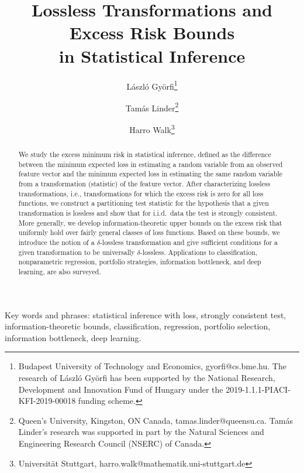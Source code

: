 \documentclass[11pt]{article}
\begin{document}
\thispagestyle{empty}
\setcounter{page}{1}


\title{Lossless Transformations and Excess Risk Bounds  \\in Statistical Inference}
\author{
L\'aszl\'o Gy\"orfi\thanks{Budapest University of Technology and Economics, gyorfi@cs.bme.hu. The research of L\'aszl\'o Gy\"orfi has been supported by the National Research, Development and Innovation Fund of Hungary under the 2019-1.1.1-PIACI-KFI-2019-00018 funding
scheme.}
\and
Tam\'as Linder\thanks{Queen's University, Kingston, ON Canada, tamas.linder@queensu.ca. Tam\'as Linder's research was supported in part by the Natural Sciences and Engineering Research Council (NSERC) of Canada.}
\and
Harro Walk\thanks{Universit\"at Stuttgart, harro.walk@mathematik.uni-stuttgart.de} }

\maketitle


\begin{abstract}
We study the excess minimum risk in statistical inference, defined as the difference between the minimum expected loss in estimating a random variable from an observed  feature vector and the minimum expected loss in estimating the same random variable from a transformation (statistic) of the feature vector. After characterizing lossless transformations, i.e., transformations for which the excess risk is zero for all loss functions, we construct a partitioning test statistic 
for the hypothesis that a given transformation is lossless and show that for i.i.d.\ data the test is strongly consistent. More generally, we develop information-theoretic upper bounds on the excess risk that uniformly hold over  fairly general classes of loss functions. Based on these bounds, we introduce the notion of a $\delta$-lossless transformation and give sufficient conditions for a given transformation to be universally $\delta$-lossless. Applications  to classification, nonparametric regression, portfolio strategies, information bottleneck,  and deep learning, are also surveyed. 
\end{abstract}

\noindent


\noindent

{\sc Key words and phrases}: statistical inference with loss, 
 strongly consistent test, information-theoretic bounds, classification, regression, portfolio selection, information bottleneck, deep learning. 
\end{document}
